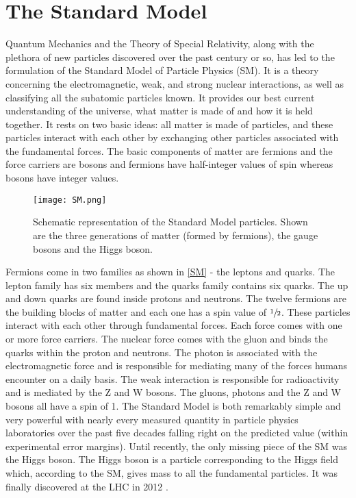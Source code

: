 \section{The Standard Model}

Quantum Mechanics and the Theory of Special Relativity, along with the plethora of new particles discovered over the past century or so, has led to the formulation of the Standard Model of Particle Physics (SM)\cite{SM1}. It is a theory concerning the electromagnetic, weak\cite{EWT}, and strong nuclear interactions\cite{QCD}, as well as classifying all the subatomic particles known. It provides our best current understanding of the universe, what matter is made of and how it is held together. It rests on two basic ideas: all matter is made of particles, and these particles interact with each other by exchanging other particles associated with the fundamental forces. The basic components of matter are fermions and the force carriers are bosons and fermions have half-integer values of spin whereas bosons have integer values.

\begin{figure}[H]
\begin{center}
\texttt{[image: SM.png]} 
\caption{Schematic representation of the Standard Model particles. Shown are the three generations of matter (formed by fermions), the gauge bosons and the Higgs boson.}
\label{SM} 
\end{center}
\end{figure}

Fermions come in two families as shown in \autoref{SM} - the leptons and quarks. The lepton family has six members and the quarks family contains six quarks. The up and down quarks are found inside protons and neutrons. The twelve fermions are the building blocks of matter and each one has a spin value of $\sfrac{1}{2}$. These particles interact with each other through fundamental forces. Each force comes with one or more force carriers. The nuclear force comes with the gluon and binds the quarks within the proton and neutrons. The photon is associated with the electromagnetic force and is responsible for mediating many of the forces humans encounter on a daily basis. The weak interaction is responsible for radioactivity and is mediated by the Z and W bosons. The gluons, photons and the Z and W bosons all have a spin of 1. The Standard Model is both remarkably simple and very powerful with nearly every measured quantity in particle physics laboratories over the past five decades falling right on the predicted value (within experimental error margins)\cite{SM2,SM3}. Until recently, the only missing piece of the SM was the Higgs boson\cite{Higgs1}. The Higgs boson is a particle corresponding to the Higgs field which, according to the SM, gives mass to all the fundamental particles. It was finally discovered at the LHC in 2012 \cite{Higgs,Higgs2}.

